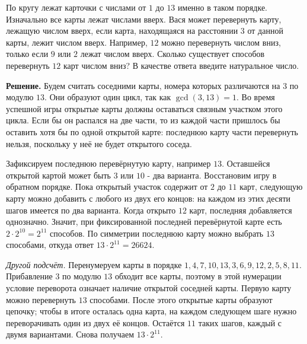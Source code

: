 \begin{problems}
\item По кругу лежат карточки с числами от $1$ до $13$ именно в таком порядке. Изначально все карты лежат числами вверх. Вася может перевернуть карту, лежащую числом вверх, если карта, находящаяся на расстоянии $3$ от данной карты, лежит числом вверх. Например, $12$ можно перевернуть числом вниз, только если $9$ или $2$ лежат числом вверх. Сколько существует способов перевернуть $12$ карт числом вниз? В качестве ответа введите натуральное число.
\par\smallskip\noindent\textbf{Решение.} Будем считать соседними карты, номера которых различаются на $3$ по модулю $13$. Они образуют один цикл, так как $\gcd(3,13)=1$. Во время успешной игры открытые карты должны оставаться связным участком этого цикла. Если бы он распался на две части, то из каждой части пришлось бы оставить хотя бы по одной открытой карте: последнюю карту части перевернуть нельзя, поскольку у неё не будет открытого соседа.
\par Зафиксируем последнюю перевёрнутую карту, например $13$. Оставшейся открытой картой может быть $3$ или $10$ - два варианта. Восстановим игру в обратном порядке. Пока открытый участок содержит от $2$ до $11$ карт, следующую карту можно добавить с любого из двух его концов: на каждом из этих десяти шагов имеется по два варианта. Когда открыто $12$ карт, последняя добавляется однозначно. Значит, при фиксированной последней перевёрнутой карте есть $2\cdot2^{10}=2^{11}$ способов. По симметрии последнюю карту можно выбрать $13$ способами, откуда ответ $13\cdot2^{11}=26624$.
\par\textit{Другой подсчёт.} Перенумеруем карты в порядке $1,4,7,10,13,3,6,9,12,2,5,8,11$. Прибавление $3$ по модулю $13$ обходит все карты, поэтому в этой нумерации условие переворота означает наличие открытой соседней карты. Первую карту можно перевернуть $13$ способами. После этого открытые карты образуют цепочку; чтобы в итоге осталась одна карта, на каждом следующем шаге нужно переворачивать один из двух её концов. Остаётся $11$ таких шагов, каждый с двумя вариантами. Снова получаем $13\cdot2^{11}$.\par


\end{problems}
